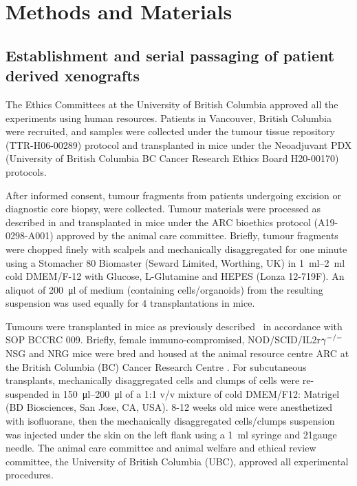 \chapter{Methods and Materials}



\section{Establishment and serial passaging of patient derived xenografts } 

The Ethics Committees at the University of British Columbia approved all the experiments using human resources.  
Patients in Vancouver, British Columbia were recruited, and samples were collected under the tumour tissue repository (TTR-H06-00289) protocol and transplanted in mice under the Neoadjuvant PDX (University of British Columbia BC Cancer Research Ethics Board H20-00170) protocols.

After informed consent, tumour fragments from patients undergoing excision or diagnostic core biopsy, were collected. 
Tumour materials were processed as described in \cite{eirew2015dynamics} and transplanted in mice under the \ac{ARC} bioethics protocol (A19-0298-A001) approved by the animal care committee.
Briefly, tumour fragments were chopped finely with scalpels and mechanically disaggregated for one minute using a Stomacher 80 Biomaster (Seward Limited, Worthing, UK) in \SIrange{1}{2}{\ml} cold DMEM/F-12 with Glucose, L-Glutamine and HEPES (Lonza 12-719F).
An aliquot of \SI{200}{\ul} of medium (containing cells/organoids) from the resulting suspension was used equally for 4 transplantations in mice.

Tumours were transplanted in mice as previously described~\cite{eirew2015dynamics} in accordance with SOP BCCRC 009. 
Briefly, female immuno-compromised, NOD/SCID/IL2r$\gamma^{\small{-/-}}$\ac{NSG} and        
\ac{NRG} \cite{pearson2008non} mice were bred and housed at the animal resource centre \ac{ARC} at the British Columbia (BC) Cancer Research Centre . 
For subcutaneous transplants, mechanically disaggregated cells and clumps of cells were re-suspended in \SIrange{150}{200}{\ul} of a 1:1 v/v mixture of cold DMEM/F12: Matrigel (BD Biosciences, San Jose, CA, USA).
8-12 weeks old mice were anesthetized with isofluorane, then the mechanically disaggregated cells/clumps suspension was injected under the skin on the left flank using a \SI{1}{\ml} syringe and 21gauge needle. 
The animal care committee and animal welfare and ethical review committee, the University of British Columbia (UBC), approved all experimental procedures.

